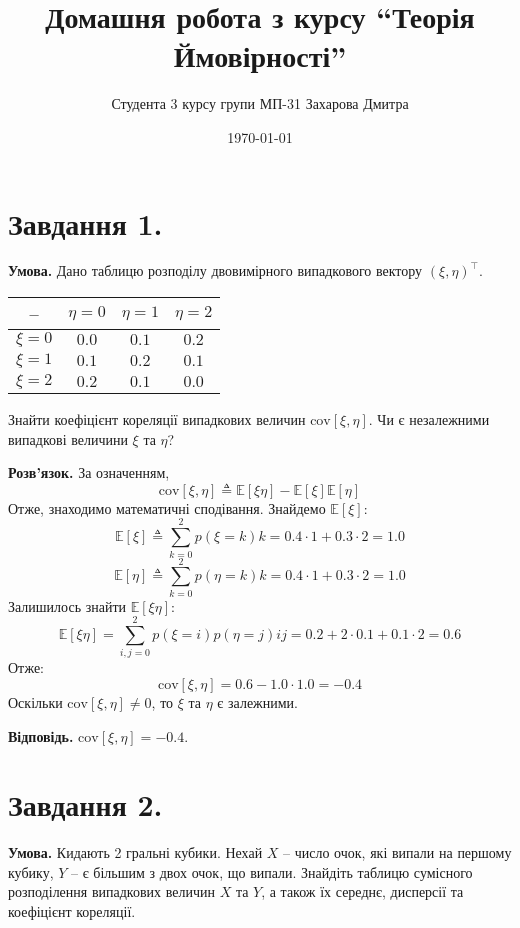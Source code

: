 \documentclass[14pt]{extarticle}
\title{Домашня робота з курсу ``Теорія Ймовірності''}
\author{Студента 3 курсу групи МП-31 Захарова Дмитра}
\date{\today}
\begin{document}
\maketitle

\section*{Завдання 1.} 

\textbf{Умова.} Дано таблицю розподілу двовимірного випадкового вектору $(\xi,\eta)^{\top}$.

\begin{center}
\begin{tabular}{ |c|c|c|c| } 
 \hline
 -- & $\eta=0$ & $\eta=1$ & $\eta=2$ \\ 
 \hline
 $\xi=0$ & $0.0$ & $0.1$ & $0.2$ \\ 
 \hline
 $\xi=1$ & $0.1$ & $0.2$ & $0.1$ \\ 
 \hline
 $\xi=2$ & $0.2$ & $0.1$ & $0.0$ \\
 \hline
\end{tabular}
\end{center}

Знайти коефіцієнт кореляції випадкових величин $\text{cov}[\xi,\eta]$. Чи є незалежними випадкові
величини $\xi$ та $\eta$?

\textbf{Розв'язок.} За означенням,
\[
\text{cov}[\xi,\eta] \triangleq \mathbb{E}[\xi\eta] - \mathbb{E}[\xi]\mathbb{E}[\eta]
\]
Отже, знаходимо математичні сподівання. Знайдемо $\mathbb{E}[\xi]$:
\[
\mathbb{E}[\xi] \triangleq \sum_{k=0}^2 p(\xi=k)k = 0.4 \cdot 1 + 0.3 \cdot 2 = 1.0
\]
\[
\mathbb{E}[\eta] \triangleq \sum_{k=0}^2 p(\eta=k)k = 0.4 \cdot 1 + 0.3 \cdot 2 = 1.0
\]
Залишилось знайти $\mathbb{E}[\xi\eta]$:
\[
\mathbb{E}[\xi\eta] = \sum_{i,j=0}^2 p(\xi=i)p(\eta=j)ij = 0.2 + 2 \cdot 0.1 + 0.1 \cdot 2 = 0.6
\]
Отже:
\[
\text{cov}[\xi,\eta] = 0.6 - 1.0 \cdot 1.0 = -0.4
\]
Оскільки $\text{cov}[\xi,\eta] \neq 0$, то $\xi$ та $\eta$ є залежними.

\textbf{Відповідь.} $\text{cov}[\xi,\eta]=-0.4$.

\section*{Завдання 2.}

\textbf{Умова.} Кидають 2 гральні кубики. Нехай $X$ -- число очок, які випали на першому кубику, $Y$ -- є
більшим з двох очок, що випали. Знайдіть таблицю сумісного розподілення випадкових величин $X$ та $Y$, а також їх середнє, дисперсії та коефіцієнт кореляції.
\end{document}

